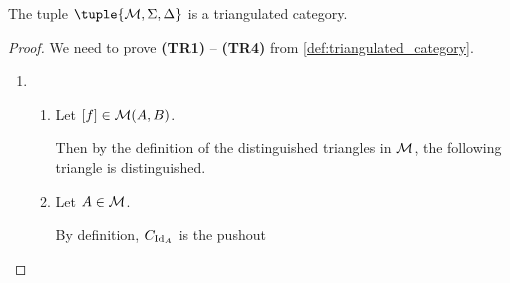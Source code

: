 \begin{example}
    \label{example:stable_module_category_triangulated}
    The tuple \( \tuple{\Mc, \Sigma, \Delta} \) is a triangulated category.
\end{example}
\begin{proof} %
    We need to prove {\bf (TR1)} -- {\bf (TR4)} from \autoref{def:triangulated_category}.
    \begin{enumerate}[label={(\bfseries TR\arabic*)}]
        \item {
            \begin{enumerate}
                \item {
                    Let \( [f] \in {\mathcal{M}}(A, B) \).
                    
                    Then by the definition of the distinguished triangles in \( {\mathcal{M}} \), the following triangle is distinguished.
                    \begin{center}
                    \end{center}
                }
                \item {
                    Let \( A \in {\mathcal{M}} \).
                    
                    By definition, \( C_{\operatorname{Id}_A} \) is the pushout
                    \begin{center}
\end{center}}
\end{enumerate}}
\end{enumerate}
\end{proof}
